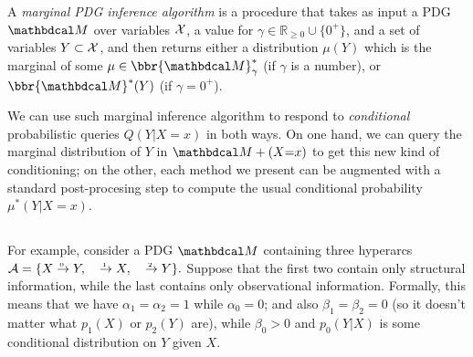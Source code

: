 \documentclass{article}
\begin{document}
\begin{defn}
    A \emph{marginal PDG inference algorithm} is a procedure
    that takes as input
    a PDG $\dg M$ over variables $\mathcal X$,
    a value for $\gamma \in \mathbb R_{\ge 0} \cup \{0^+\}$,
    and
    a set of variables $Y \subset \mathcal X$,
    and then returns either a distribution $\mu(Y)$
    which is the
    marginal
    of some $\mu \in \bbr{\dg M}^*_\gamma$  (if $\gamma$ is a number),
    or $\bbr{\dg M}^*(Y)$ (if $\gamma = 0^+$).
\end{defn}

We can use such marginal inference algorithm
to respond to \emph{conditional} probabilistic queries
$Q(Y|X{=}x)$ in both ways.
On one hand, we can query the marginal distribution of $Y$ in $\dg M + (X{=}x)$
to get this new kind of conditioning;
%
on the other,
each method we present can be augmented with a standard post-procesing step
to compute the usual conditional probability $\mu^*(Y|X{=}x)$.


\subsection{}
\label{sec:example-gamma}
For example, consider a PDG $\dg M$ containing three hyperarcs
$
    \Ar = \{ \ed0XY, \quad \ed{1}{}{X}, \quad \ed2{}Y  \}.
$
Suppose that the first two contain only structural information, 
while the last contains only observational information. 
Formally, this means that we have $\alpha_1 = \alpha_2 = 1$ while $\alpha_0 = 0$;
and also $\beta_1 = \beta_2 = 0$ (so it doesn't matter what $p_1(X)$ or $p_2(Y)$ are), while $\beta_0 > 0$ and $p_0(Y|X)$ is some conditional distribution on $Y$ given $X$. 
\end{document}
